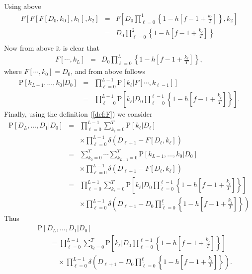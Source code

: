 \documentclass[10pt]{iopart}
\newcommand{\1}{\mathbf{1}}
\newcommand{\Prob}{\mathrm{P}}
\begin{document}
%
Using above
%
\begin{eqnarray}
%
F[F[F[D_{0},k_{0}],k_{1}],k_{2}]&=& F\left[D_{0}\prod_{\ell=0}^1\left\{1- h\left[f- 1+\frac{k_{\ell}}{T}\right]\right\},k_2\right]\nonumber\\
%
&=& D_{0}\prod_{\ell=0}^2\left\{1- h\left[f- 1+\frac{k_{\ell}}{T}\right]\right\}\nonumber\\
%
\end{eqnarray}
%
Now from above it is clear that 
%
\begin{eqnarray}
%
F[\cdots,k_{L}]&=& D_{0}\prod_{\ell=0}^L\left\{1- h\left[f- 1+\frac{k_{\ell}}{T}\right]\right\},
%
\end{eqnarray}
%
where  $F[\cdots,k_{0}]= D_{0}$, and from above follows
%
\begin{eqnarray}
\Prob\left[k_{L-1},\ldots,k_{0}\vert D_{0}\right]&=&\prod_{\ell=0}^{L-1}\Prob[k_\ell\vert F[\cdots,k_{\ell-1}]]\nonumber\\
%
&=&\prod_{\ell=0}^{L-1}\Prob\left[k_\ell\Bigg\vert D_{0}\prod_{\tilde{\ell}=0}^{\ell-1}\left\{1- h\left[f- 1+\frac{k_{\tilde{\ell}}}{T}\right]\right\}\right].
%
\end{eqnarray}
%
Finally, using the definition (\ref{def:F}) we consider
%
\begin{eqnarray}
\Prob\left[D_{L},\ldots,D_{1}\vert D_{0}\right]
%
&=&\prod_{\ell=0}^{L-1}\sum_{k_\ell=0}^T\Prob[k_\ell\vert D_\ell]\nonumber\\
&&\times\prod_{\ell=0}^{L-1}\delta\left(D_{\ell+1}- F[D_{\ell},k_{\ell}]\right)\nonumber\\
%
&=&\sum_{k_0=0}^T\cdots \sum_{k_{L-1}=0}^T\Prob\left[k_{L-1},\ldots,k_{0}\vert D_{0}\right]\nonumber\\
&&\times\prod_{\ell=0}^{L-1}\delta\left(D_{\ell+1}- F[D_{\ell},k_{\ell}]\right)\nonumber\\
%
&=&\prod_{\ell=0}^{L-1}\sum_{k_{\ell}=0}^T\Prob\left[k_\ell\Bigg\vert D_{0}\prod_{\tilde{\ell}=0}^{\ell-1}\left\{1- h\left[f- 1+\frac{k_{\tilde{\ell}}}{T}\right]\right\}\right]\nonumber\\
&&\times\prod_{\ell=0}^{L-1}\delta\left(D_{\ell+1}- D_{0}\prod_{\tilde{\ell}=0}^{\ell}\left\{1- h\left[f- 1+\frac{k_{\tilde{\ell}}}{T}\right]\right\}\right)
%
\end{eqnarray}
%
Thus
%
\begin{eqnarray}
&&\Prob\left[D_{L},\ldots,D_{1}\vert D_{0}\right]\nonumber\\
&&~~~~~~~~=\prod_{\ell=0}^{L-1}\sum_{k_{\ell}=0}^T\Prob\left[k_\ell\Bigg\vert D_{0}\prod_{\tilde{\ell}=0}^{\ell-1}\left\{1- h\left[f- 1+\frac{k_{\tilde{\ell}}}{T}\right]\right\}\right]\nonumber\\
&&~~~~~~~~~~~~~\times\prod_{\ell=0}^{L-1}\delta\left(D_{\ell+1}- D_{0}\prod_{\tilde{\ell}=0}^{\ell}\left\{1- h\left[f- 1+\frac{k_{\tilde{\ell}}}{T}\right]\right\}\right).
%
\end{eqnarray}
\end{document}
